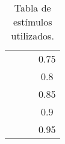 \begin{table}[H]
{\begin{tabular}{c|c|c|c}
                        &                      &                                     & \multicolumn{1}{c}{0.75} \\
                        &                      &                                     & \multicolumn{1}{c}{0.8}  \\
                        &                      &                                     & \multicolumn{1}{c}{0.85} \\
                        &                      &                                     & \multicolumn{1}{c}{0.9}  \\
                        &                      &                                     & \multicolumn{1}{c}{0.95}	\\ \bottomrule
\end{tabular}%
}
\caption{Tabla de estímulos utilizados.}
\label{tab:estimulos}
\end{table}